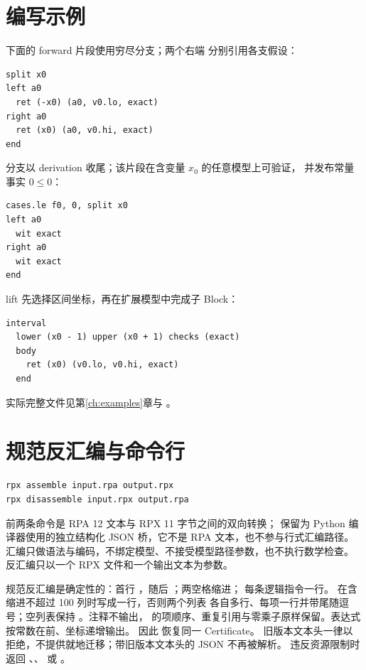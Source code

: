 \section{编写示例}
\label{sec:rpa-examples}

下面的 forward 片段使用穷尽分支；两个右端  分别引用各支假设：
\begin{lstlisting}
split x0
left a0
  ret (-x0) (a0, v0.lo, exact)
right a0
  ret (x0) (a0, v0.hi, exact)
end
\end{lstlisting}

 分支以 derivation 收尾；该片段在含变量 $x_0$ 的任意模型上可验证，
并发布常量事实 $0\le0$：
\begin{lstlisting}
cases.le f0, 0, split x0
left a0
  wit exact
right a0
  wit exact
end
\end{lstlisting}

 lift 先选择区间坐标，再在扩展模型中完成子 Block：
\begin{lstlisting}
interval
  lower (x0 - 1) upper (x0 + 1) checks (exact)
  body
    ret (x0) (v0.lo, v0.hi, exact)
  end
\end{lstlisting}
实际完整文件见第\ref{ch:examples}章与 。

\section{规范反汇编与命令行}
\label{sec:rpa-cli}

\begin{lstlisting}
rpx assemble input.rpa output.rpx
rpx disassemble input.rpx output.rpa
\end{lstlisting}
前两条命令是 RPA 12 文本与 RPX 11 字节之间的双向转换； 保留为
Python 编译器使用的独立结构化 JSON 桥，它不是 RPA 文本，也不参与行式汇编路径。
汇编只做语法与编码，不绑定模型、不接受模型路径参数，也不执行数学检查。
反汇编只以一个 RPX 文件和一个输出文本为参数。

规范反汇编是确定性的：首行 ，随后 ；两空格缩进；
每条逻辑指令一行。 在含缩进不超过 100 列时写成一行，否则两个列表
各自多行、每项一行并带尾随逗号；空列表保持 \code{()}。注释不输出，
 的项顺序、重复引用与零乘子原样保留。表达式按常数在前、坐标递增输出。
因此  恢复同一 Certificate。
旧版本文本头一律以  拒绝，不提供就地迁移；带旧版本文本头的 JSON 不再被解析。
违反资源限制时返回 、、
 或 。

